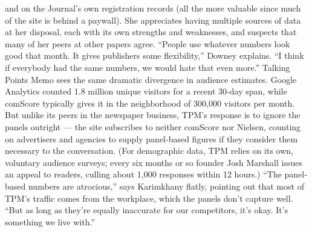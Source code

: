 and on the Journal’s own registration records (all the more valuable since
much of the site is behind a paywall). She appreciates having multiple
sources of data at her disposal, each with its own strengths and
weaknesses, and suspects that many of her peers at other papers agree.
``People use whatever numbers look good that month. It gives publishers
some flexibility,'' Downey explains. ``I think if everybody had the same
numbers, we would hate that even more.''
Talking Points Memo sees the same dramatic divergence in audience
estimates. Google Analytics counted 1.8 million unique visitors for a
recent 30‐day span, while comScore typically gives it in the neighborhood
of 300,000 visitors per month. But unlike its peers in the newspaper
business, TPM’s response is to ignore the panels outright — the site
subscribes to neither comScore nor Nielsen, counting on advertisers and
agencies to supply panel‐based figures if they consider them necessary to
the conversation. (For demographic data, TPM relies on its own, voluntary
audience surveys; every six months or so founder Josh Marshall issues an
appeal to readers, culling about 1,000 responses within 12 hours.)
``The panel‐based numbers are atrocious,'' says Karimkhany flatly,
pointing out that most of TPM’s traffic comes from the workplace, which
the panels don’t capture well. ``But as long as they’re equally inaccurate
for our competitors, it’s okay. It’s something we live with.''
